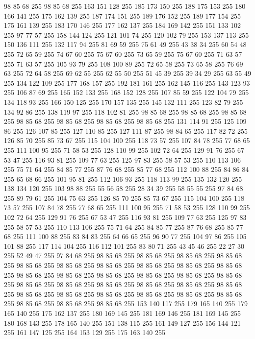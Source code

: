 98 85 68 255 98 85 68 255 163 151 128 255 185 173 150 255 188 175 153 255 180 166 141 255 175 162 139 255 187 174 151 255 189 176 152 255 189 177 154 255 175 161 139 255 183 170 146 255 177 162 137 255 184 169 142 255 151 133 102 255 97 77 57 255 158 144 124 255 121 101 74 255 120 102 79 255 153 137 113 255 150 136 111 255 132 117 94 255 81 69 59 255 75 61 49 255 43 38 34 255 60 54 48 255 72 65 59 255 74 67 60 255 75 67 60 255 73 65 59 255 75 67 60 255 71 63 57 255 71 63 57 255 105 93 79 255 108 100 89 255 72 65 58 255 73 65 58 255 76 69 63 255 72 64 58 255 69 62 55 255 62 55 50 255 51 45 39 255 39 34 29 255 63 55 49 255 134 122 109 255 177 168 157 255 192 181 161 255 162 145 116 255 143 123 93 255 106 87 69 255 165 152 133 255 168 152 128 255 107 85 59 255 122 104 79 255 134 118 93 255 166 150 125 255 170 157 135 255 145 132 111 255 123 82 79 255 134 92 86 255 138 119 97 255 118 102 81 255 98 85 68 255 98 85 68 255
98 85 68 255 98 85 68 255 98 85 68 255 98 85 68 255 98 85 68 255 131 114 91 255 125 109 86 255 126 107 85 255 127 110 85 255 127 111 87 255 98 84 65 255 117 82 72 255 126 85 70 255 85 73 67 255 115 104 100 255 118 73 57 255 107 84 78 255 77 68 65 255 111 100 95 255 71 58 53 255 128 110 99 255 102 72 64 255 129 91 76 255 67 53 47 255 116 93 81 255 109 77 63 255 125 97 83 255 58 57 53 255 110 113 106 255 75 71 64 255 84 85 77 255 87 76 68 255 85 77 68 255 112 100 88 255 84 86 84 255 65 68 66 255 101 95 81 255 112 106 93 255 118 113 99 255 135 132 120 255 138 134 120 255 103 98 88 255 55 56 58 255 28 34 39 255 58 55 55 255 97 84 68 255 89 79 61 255 104 75 63 255 126 85 70 255 85 73 67 255 115 104 100 255 118 73 57 255 107 84 78 255 77 68 65 255 111 100 95 255 71 58 53 255 128 110 99 255 102 72 64 255 129 91 76 255 67 53 47 255 116 93 81 255 109 77 63 255 125 97 83 255 58 57 53 255
110 113 106 255 75 71 64 255 84 85 77 255 87 76 68 255 85 77 68 255 111 100 88 255 83 84 83 255 64 66 65 255 96 90 77 255 104 97 86 255 105 101 88 255 117 114 104 255 116 112 101 255 83 80 71 255 43 45 46 255 22 27 30 255 52 49 47 255 97 84 68 255 98 85 68 255 98 85 68 255 98 85 68 255 98 85 68 255 98 85 68 255 98 85 68 255 98 85 68 255 98 85 68 255 98 85 68 255 98 85 68 255 98 85 68 255 98 85 68 255 98 85 68 255 98 85 68 255 98 85 68 255 98 85 68 255 98 85 68 255 98 85 68 255 98 85 68 255 98 85 68 255 98 85 68 255 98 85 68 255 98 85 68 255 98 85 68 255 98 85 68 255 98 85 68 255 98 85 68 255 98 85 68 255 98 85 68 255 98 85 68 255 98 85 68 255 153 140 117 255 179 165 140 255 179 165 140 255 175 162 137 255 180 169 145 255 181 169 146 255 181 169 145 255 180 168 143 255 178 165 140 255 151 138 115 255 161 149 127 255 156 144 121 255 161 147 125 255 164 153 129 255 175 163 140 255
